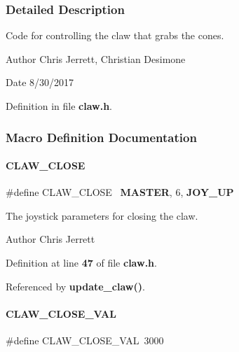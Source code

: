 \subsubsection{Detailed Description}
Code for controlling the claw that grabs the cones. 

\begin{DoxyAuthor}{Author}
Chris Jerrett, Christian Desimone 
\end{DoxyAuthor}
\begin{DoxyDate}{Date}
8/30/2017 
\end{DoxyDate}


Definition in file \textbf{ claw.\+h}.



\subsubsection{Macro Definition Documentation}
\mbox{\label{claw_8h_af2a18397e9efae0be9470a76797b2077}} 
\paragraph{C\+L\+A\+W\+\_\+\+C\+L\+O\+SE}
{\footnotesize\ttfamily \#define C\+L\+A\+W\+\_\+\+C\+L\+O\+SE~\textbf{ M\+A\+S\+T\+ER}, 6, \textbf{ J\+O\+Y\+\_\+\+UP}}



The joystick parameters for closing the claw. 

\begin{DoxyAuthor}{Author}
Chris Jerrett 
\end{DoxyAuthor}


Definition at line \textbf{ 47} of file \textbf{ claw.\+h}.



Referenced by \textbf{ update\+\_\+claw()}.

\mbox{\label{claw_8h_a78d3e6f3d4b60e1be137fdc6dd144224}} 
\paragraph{C\+L\+A\+W\+\_\+\+C\+L\+O\+S\+E\+\_\+\+V\+AL}
{\footnotesize\ttfamily \#define C\+L\+A\+W\+\_\+\+C\+L\+O\+S\+E\+\_\+\+V\+AL~3000}



